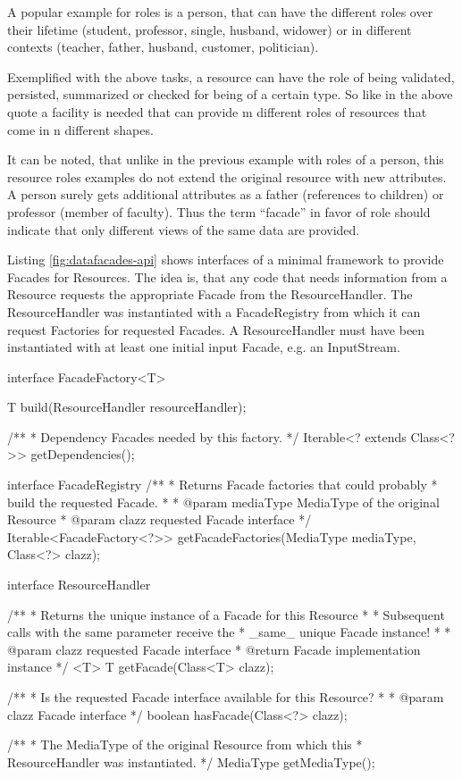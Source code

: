 \documentclass[12pt,a4paper]{scrartcl}		%
\begin{document}
A popular example for roles is a person, that can have the different roles over
their lifetime (student, professor, single, husband, widower) or in different
contexts (teacher, father, husband, customer, politician).


Exemplified with the above tasks, a resource can have the role of being
validated, persisted, summarized or checked for being of a certain type. So like
in the above quote a facility is needed that can provide m different roles of
resources that come in n different shapes.

It can be noted, that unlike in the previous example with roles of a person,
this resource roles examples do not extend the original resource with new
attributes. A person surely gets additional attributes as a father (references
to children) or professor (member of faculty). Thus the term ``facade'' in favor
of role should indicate that only different views of the same data are provided.

Listing \ref{fig:datafacades-api} shows interfaces of a minimal framework to
provide Facades for Resources. The idea is, that any code that needs information
from a Resource requests the appropriate Facade from the ResourceHandler. The
ResourceHandler was instantiated with a FacadeRegistry from which it can request
Factories for requested Facades. A ResourceHandler must have been instantiated
with at least one initial input Facade, e.g. an InputStream.

\begin{javalisting}[label=fig:datafacades-api,
                    float=p,
                   caption={API of the ResourceFacades component}]
interface FacadeFactory<T> {
 T build(ResourceHandler resourceHandler);

 /**
  * Dependency Facades needed by this factory.
  */
 Iterable<? extends Class<?>> getDependencies();
}

interface FacadeRegistry {
 /**
  * Returns Facade factories that could probably
  * build the requested Facade.
  *
  * @param mediaType MediaType of the original Resource
  * @param clazz requested Facade interface
  */
 Iterable<FacadeFactory<?>> getFacadeFactories(MediaType mediaType,
                                               Class<?> clazz);
}

interface ResourceHandler {
 /**
  * Returns the unique instance of a Facade for this Resource
  *
  * Subsequent calls with the same parameter receive the
  * _same_ unique Facade instance!
  *
  * @param clazz requested Facade interface
  * @return Facade implementation instance
  */
 <T> T getFacade(Class<T> clazz);

 /**
  * Is the requested Facade interface available for this Resource?
  *
  * @param clazz Facade interface
  */
 boolean hasFacade(Class<?> clazz);

 /**
  * The MediaType of the original Resource from which this 
  * ResourceHandler was instantiated.
  */
 MediaType getMediaType();
}
\end{javalisting}
\end{document}
